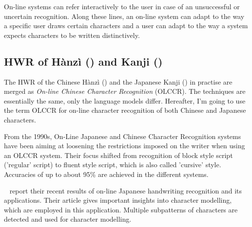 On-line systems can refer interactively to the user in case of an unsuccessful 
or uncertain recognition. Along these lines, an on-line system can adapt to 
the way a specific user draws certain characters and a user can adapt to the
way a system expects characters to be written distinctively.

\subsection{HWR of Hànzì () and Kanji ()}
\label{sec:hwrofhanziandKanji}


The HWR of the Chinese Hànzì () and the Japanese Kanji () 
in practise are merged as \emph{On-line Chinese Character Recognition} (OLCCR). 
The techniques are essentially the same, only the language models differ. 
Hereafter, I'm going to use the term OLCCR for on-line character recognition of 
both Chinese and Japanese characters.

From the 1990s, On-Line Japanese and Chinese Character Recognition 
systems have been aiming at loosening the restrictions imposed on 
the writer when using an OLCCR system. Their focus shifted from recognition 
of block style script ('regular' script) to fluent style script, 
which is also called 'cursive' style. Accuracies of up to about 95\% are
achieved in the different systems.

~\citeyear{Nakagawa2008} report their recent results of on-line Japanese 
handwriting recognition and its applications. Their article gives 
important insights into character modelling, which are employed in 
this application. Multiple subpatterns of characters are detected and used for
character modelling.

